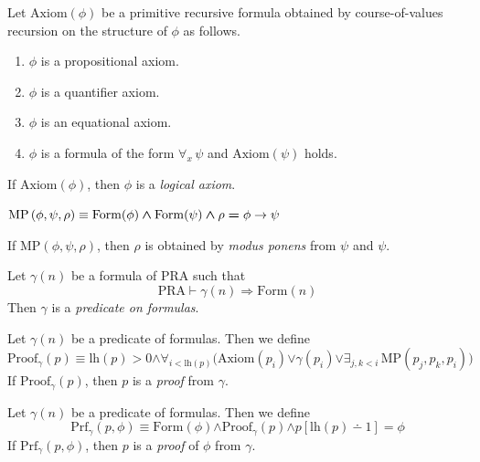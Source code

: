 \documentclass[10pt]{amsart}
\newcommand{\mforall}{\boldsymbol{\forall}}
\newcommand{\mexists}{\boldsymbol{\exists}}
\newcommand{\mra}{\boldsymbol{\Rightarrow}}
\newcommand{\mand}{\boldsymbol{\wedge}}
\newcommand{\mor}{\boldsymbol{\vee}}
\newcommand{\mle}{\boldsymbol{<}}
\newcommand{\mge}{\boldsymbol{>}}
\newcommand{\meq}{\boldsymbol{=}}
\begin{document}
\begin{definition}
  Let $\mathrm{Axiom}(\phi)$ be a primitive recursive formula obtained by course-of-values recursion on the structure of $\phi$ as follows.
  \begin{enumerate}[label=\textbf{(\arabic*)}, leftmargin=3.0em]
    \item $\phi$ is a propositional axiom.
    \item $\phi$ is a quantifier axiom.
    \item $\phi$ is an equational axiom.
    \item $\phi$ is a formula of the form $\forall_x\,\psi$ and $\mathrm{Axiom}(\psi)$ holds.
  \end{enumerate}
  If $\mathrm{Axiom}(\phi)$, then $\phi$ is a \textit{logical axiom}.
\end{definition}

\begin{definition}
  $\mathrm{MP}\left(\phi,\psi,\rho\right) \equiv \mathrm{Form}(\phi) \mand \mathrm{Form}(\psi) \mand \rho \meq \phi \ra \psi$

  If $\mathrm{MP}\left(\phi,\psi,\rho\right)$, then $\rho$ is obtained by \textit{modus ponens} from $\psi$ and $\psi$.
\end{definition}

\begin{definition}
  Let $\gamma(n)$ be a formula of $\mathrm{PRA}$ such that
  $$\mathrm{PRA} \vdash \gamma(n) \mra \mathrm{Form}(n)$$
  Then $\gamma$ is a \textit{predicate on formulas}.
\end{definition}

\begin{definition}
  Let $\gamma(n)$ be a predicate of formulas. Then we define
  $$\mathrm{Proof}_{\gamma}(p) \equiv \mathrm{lh}(p) \mge 0 \mand \mforall_{i \mle \mathrm{lh}(p)}\bigl(\mathrm{Axiom}(p_i) \mor \gamma(p_i) \mor \mexists_{j,k \mle i}\,\mathrm{MP}(p_j,p_k,p_i)\bigr)$$
  If $\mathrm{Proof}_{\gamma}(p)$, then $p$ is a \textit{proof} from $\gamma$. 
 \end{definition}

 \begin{definition}
  Let $\gamma(n)$ be a predicate of formulas. Then we define
  $$\mathrm{Prf}_{\gamma}(p,\phi) \equiv \mathrm{Form}(\phi) \mand \mathrm{Proof}_{\gamma}(p) \mand p[\mathrm{lh}(p)\dotminus 1] \meq \phi$$
  If $\mathrm{Prf}_{\gamma}(p,\phi)$, then $p$ is a \textit{proof} of $\phi$ from $\gamma$.
\end{definition}
\end{document}

